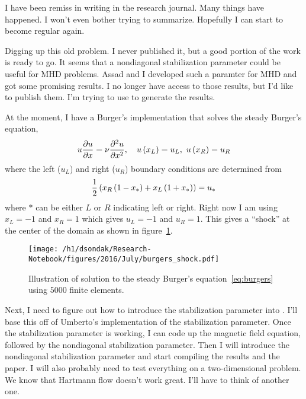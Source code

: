 


I have been remiss in writing in the research journal.  Many things have happened.
I won't even bother trying to summarize.  Hopefully I can start to become regular
again.

Digging up this old problem.  I never published it, but a good portion of the work is ready to go.
It seems that a nondiagonal stabilization parameter could be useful for MHD problems.  Assad and I
developed such a paramter for MHD and got some promising results.  I no longer have access to those
results, but I'd like to publish them.  I'm trying to use \fenics to generate the results.

At the moment, I have a Burger's implementation that solves the steady Burger's equation,
\begin{align}
 u\pdeone{u}{x} = \nu\pden{u}{x}{2}, \quad u\lr{x_{L}} = u_{L}, \ u\lr{x_{R}} = u_{R} \label{eq:burgers}
\end{align}
where the left ($u_{L}$) and right ($u_{R}$) boundary conditions are determined from
\begin{align}
  \frac{1}{2}\left(x_{R}\left(1-x_{*}\right) + x_{L}\left(1+x_{*}\right)\right) = u_{*}
\end{align}
where $*$ can be either $L$ or $R$ indicating left or right.  Right now I am using
$x_{L} = -1$ and $x_{R} = 1$ which gives $u_{L} = -1$ and $u_{R} = 1$.  This gives
a ``shock'' at the center of the domain as shown in figure~\ref{fig:burgers_shock}.
\begin{figure}[h!]
  \centering
  \texttt{[image: /h1/dsondak/Research-Notebook/figures/2016/July/burgers\_shock.pdf]}
  \caption{Illustration of \fenics solution to the steady Burger's equation~\eqref{eq:burgers} using $5000$ finite elements.}
  \label{fig:burgers_shock}
\end{figure}

Next, I need to figure out how to introduce the stabilization parameter into
\fenics.  I'll base this off of Umberto's \fenics implementation of the
stabilization parameter.  Once the stabilization parameter is working, I can 
code up the magnetic field equation, followed by the nondiagonal stabilization
parameter.  Then I will introduce the nondiagonal stabilization parameter and
start compiling the results and the paper.  I will also probably need to
test everything on a two-dimensional problem.  We know that Hartmann flow
doesn't work great.  I'll have to think of another one.

